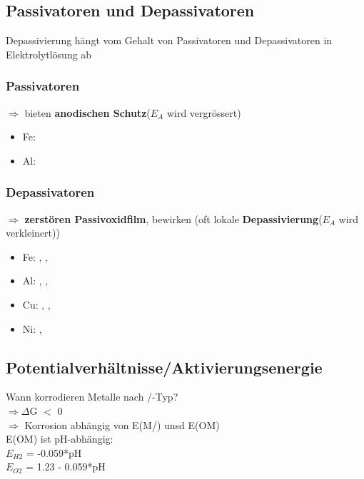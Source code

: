 \subsection{Passivatoren und Depassivatoren}
    Depassivierung hängt vom Gehalt von Passivatoren und Depassivatoren in Elektrolytlösung ab
    \subsubsection{Passivatoren}
        $\Rightarrow$ bieten \textbf{anodischen Schutz}($E_A$ wird vergrössert)
        \begin{itemize}
            \item Fe: 
            \item Al: 
        \end{itemize}
        
    \subsubsection{Depassivatoren}
        $\Rightarrow$ \textbf{zerstören Passivoxidfilm}, bewirken (oft lokale \textbf{Depassivierung}($E_A$ wird verkleinert))
        \begin{itemize}
            \item Fe: \color{blue} \color{black}, \color{red} \color{black}, 
            \item Al: \color{blue} \color{black}, \color{red} \color{black}, 
            \item Cu: \color{blue} \color{black}, \color{red} \color{black}, 
            \item Ni: \color{blue} \color{black}, \color{red} \color{black}
        \end{itemize}
        
\subsection{Potentialverhältnisse/Aktivierungsenergie}
    Wann korrodieren Metalle nach /-Typ?\\
    $\Rightarrow \Delta$G $<$ 0\\
    $\Rightarrow$ Korrosion abhängig von E(M/) unsd E(OM)\\
    E(OM) ist pH-abhängig:\\
    $E_{H2}$ = -0.059*pH\\
    $E_{O2}$ = 1.23 - 0.059*pH\\
